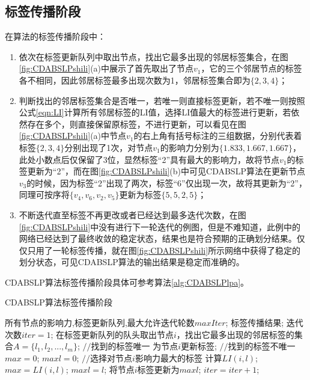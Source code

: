\subsection{标签传播阶段}

在算法的标签传播阶段中：
\begin{enumerate}
  \item 依次在标签更新队列中取出节点，找出它最多出现的邻居标签集合，在图\ref{fig:CDABSLPshili}(a)中展示了首先取出了节点$v_1$，它的三个邻居节点的标签各不相同，因此邻居标签最多出现次数为1，邻居标签集合即为$\{ 2,3,4 \} $；
  \item 判断找出的邻居标签集合是否唯一，若唯一则直接标签更新，若不唯一则按照公式\ref{eqn:LI}计算所有邻居标签的LI值，选择LI值最大的标签进行更新，若依然存在多个，则直接保留原标签，不进行更新，可以看见在图\ref{fig:CDABSLPshili}(a)中节点$v_1$的右上角有括号标注的三组数据，分别代表着标签$\{ 2,3,4 \} $分别出现了1次，对节点$v_1$的影响力分别为$\{ 1.833,1.667,1.667 \} $，此处小数点后仅保留了3位，显然标签“2”具有最大的影响力，故将节点$v_1$的标签更新为“2”，而在图\ref{fig:CDABSLPshili}(b)中可见CDABSLP算法在更新节点$v_3$的时候，因为标签“2”出现了两次，标签“6”仅出现一次，故将其更新为“2”，同理可按序将$\{ v_4,v_6,v_2,v_5 \} $更新为标签$\{ 5,5,2,5 \} $；
  \item 不断迭代直至标签不再更改或者已经达到最多迭代次数，在图\ref{fig:CDABSLPshili}中没有进行下一轮迭代的例图，但是不难知道，此例中的网络已经达到了最终收敛的稳定状态，结果也是符合预期的正确划分结果。仅仅只用了一轮标签传播，就在图\ref{fig:CDABSLPshili}所示网络中获得了稳定的划分状态，可见CDABSLP算法的输出结果是稳定而准确的。
\end{enumerate}
CDABSLP算法标签传播阶段具体可参考算法\ref{alg:CDABSLPlpa}。

\begin{algorithm}[h]  
  \caption{CDABSLP算法标签传播阶段}  
  \label{alg:CDABSLPlpa} 
  \begin{algorithmic}[1]  
    \Require  
      所有节点的影响力,标签更新队列,最大允许迭代轮数$maxIter$;  
    \Ensure  
      标签传播结果;  
    \State 迭代次数$iter=1$;  
    \Repeat  
      \State 在标签更新队列的队头取出节点$i$，找出它最多出现的邻居标签的集合$A = \{ l_1,l_2,...,l_m \} $;
        $//$找到的标签唯一
        \State 为节点$i$更新标签;  
      \Else  
        $//$找到的标签不唯一
        \State $max = 0$;
        \State $maxl = 0$;
        $//$选择对节点$i$影响力最大的标签
          \State 计算$LI(i,l)$; 
            \State $max = LI(i,l)$;
            \State $maxl = l$;
          \EndIf 
          \State 将节点$i$标签更新为$maxl$;  
        \EndFor    
      \EndIf
      \State $iter = iter + 1$;  
  \end{algorithmic}  
\end{algorithm}  

